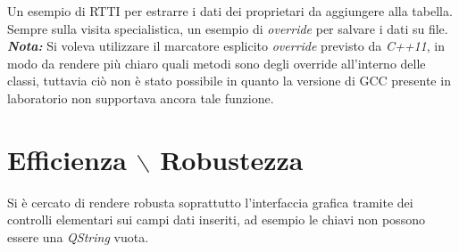  

Un esempio di RTTI per estrarre i dati dei proprietari da aggiungere alla tabella.\\

 

Sempre sulla visita specialistica, un esempio di \textit{override} per salvare i dati su file.\\

\textit{\textbf{Nota:}} Si voleva utilizzare il marcatore esplicito \textit{override} previsto da \textit{C++11}, in modo da rendere più chiaro quali metodi sono degli override all'interno delle classi, tuttavia ciò non è stato possibile in quanto la versione di GCC presente in laboratorio non supportava ancora tale funzione.

\section{Efficienza $\backslash$ Robustezza}
Si è cercato di rendere robusta soprattutto l'interfaccia grafica tramite dei controlli elementari sui campi dati inseriti, ad esempio le chiavi non possono essere una \textit{QString} vuota.